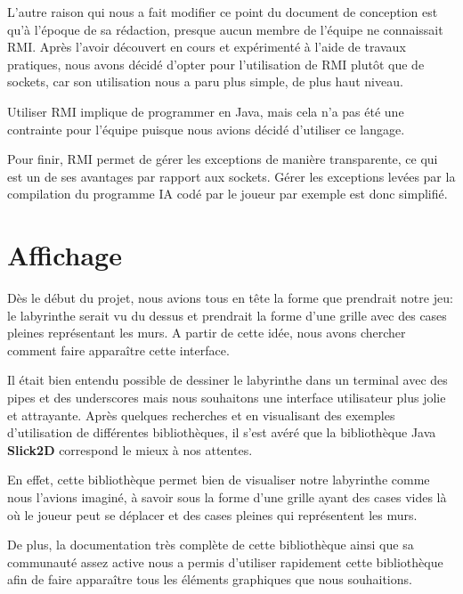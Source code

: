 	L'autre raison qui nous a fait modifier ce point du document de conception est qu'à l'époque de sa rédaction, presque aucun membre de l'équipe ne connaissait RMI\@. Après l'avoir découvert en cours et expérimenté à l'aide de travaux pratiques, nous avons décidé d'opter pour l'utilisation de RMI plutôt que de sockets, car son utilisation nous a paru plus simple, de plus haut niveau.

	Utiliser RMI implique de programmer en Java, mais cela n'a pas été une contrainte pour l'équipe puisque nous avions décidé d'utiliser ce langage.

	Pour finir, RMI permet de gérer les exceptions de manière transparente, ce qui est un de ses avantages par rapport aux sockets. Gérer les exceptions levées par la compilation du programme IA codé par le joueur par exemple est donc simplifié.


\section{Affichage}

	Dès le début du projet, nous avions tous en tête la forme que prendrait notre jeu: le labyrinthe serait vu du dessus et prendrait la forme d'une grille avec des cases pleines représentant les murs. A partir de cette idée, nous avons chercher comment faire apparaître cette interface.

	Il était bien entendu possible de dessiner le labyrinthe dans un terminal avec des pipes et des underscores mais nous souhaitons une interface utilisateur plus jolie et attrayante. Après quelques recherches et en visualisant des exemples d'utilisation de différentes bibliothèques, il s'est avéré que la bibliothèque Java \textbf{Slick2D} correspond le mieux à nos attentes.

  En effet, cette bibliothèque permet bien de visualiser notre labyrinthe comme nous l'avions imaginé, à savoir sous la forme d'une grille ayant des cases vides là où le joueur peut se déplacer et des cases pleines qui représentent les murs.

  De plus, la documentation très complète de cette bibliothèque ainsi que sa communauté assez active nous a permis d'utiliser rapidement cette bibliothèque afin de faire apparaître tous les éléments graphiques que nous souhaitions.
